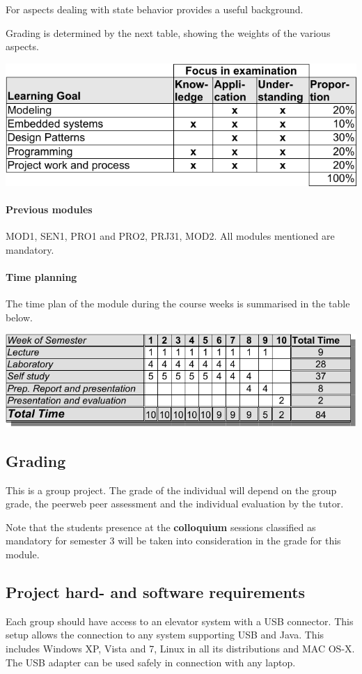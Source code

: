 For aspects dealing with state behavior \cite{DHT} provides a useful
background. 

Grading is determined by the next table, showing the weights of the various aspects.

\includegraphics{tables/learninggoals-crop.pdf}


\paragraph{Previous modules} MOD1, SEN1, PRO1 and PRO2, PRJ31, MOD2.
All modules mentioned are mandatory.

\paragraph{Time planning} The time plan of the module during the
course weeks is summarised in the table below.

\includegraphics{tables/timetable-crop.pdf}


\subsection{Grading}
This is a group project. The grade of the individual will depend on
the group grade, the peerweb peer assessment and the individual
evaluation by the tutor.

Note that the students presence at the \textbf{colloquium} sessions classified as
mandatory for semester 3 will be taken into consideration in the grade
for this module.

\subsection{Project hard- and software requirements}
Each group should have access to an elevator system with a USB
connector. This setup allows the connection to any system supporting
USB and Java. This includes Windows XP, Vista and 7, Linux in all its
distributions and MAC OS-X. The USB adapter can be used safely in
connection with any laptop.


